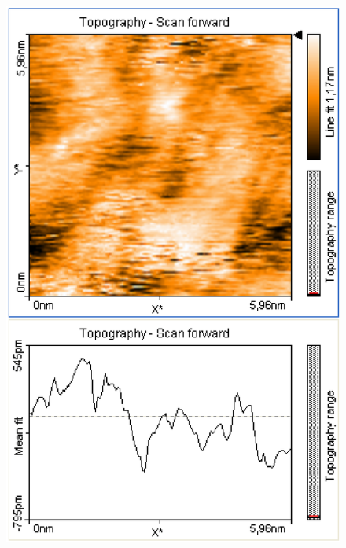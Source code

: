 \documentclass[12pt]{article}
\begin{document}
\begin{figure}[H]
\begin{minipage}{0.4\linewidth}
\includegraphics[width=0.9\linewidth]{../plot/data/mos2/mos21.eps}
\end{minipage}
\end{figure}
\end{document}
